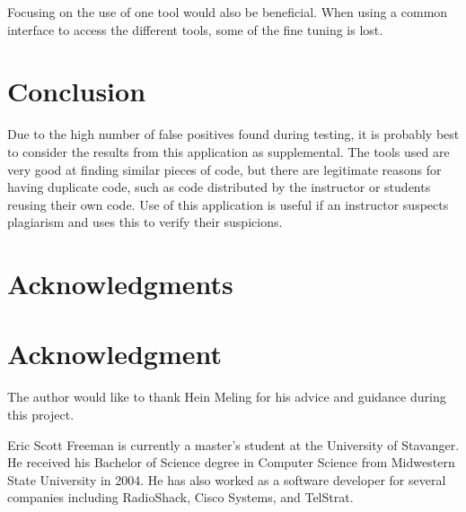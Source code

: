 \documentclass[10pt,journal,compsoc]{IEEEtran}
\begin{document}
	Focusing on the use of one tool would also be beneficial. When using a common interface to access the different tools, some of the fine tuning is lost.
	
	\section{Conclusion}
	Due to the high number of false positives found during testing, it is probably best to consider the results from this application as supplemental. The tools used are very good at finding similar pieces of code, but there are legitimate reasons for having duplicate code, such as code distributed by the instructor or students reusing their own code. Use of this application is useful if an instructor suspects plagiarism and uses this to verify their suspicions.
	
	\ifCLASSOPTIONcompsoc
		\section*{Acknowledgments}
	\else
		\section*{Acknowledgment}
	\fi
	
	The author would like to thank Hein Meling for his advice and guidance during this project.
	
	
	

\begin{IEEEbiographynophoto}{Eric Scott Freeman}
is currently a master's student at the University of Stavanger. He received his Bachelor of Science degree in Computer Science from Midwestern State University in 2004. He has also worked as a software developer for several companies including RadioShack, Cisco Systems, and TelStrat.
\end{IEEEbiographynophoto}
\end{document}
